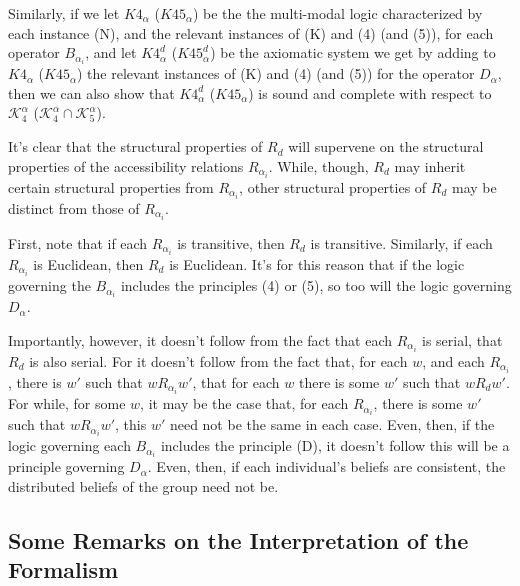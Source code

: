 Similarly, if we let $K4_\alpha$ ($K45_\alpha$) be the the multi-modal logic characterized by each instance (N), and the relevant instances of (K) and (4) (and (5)), for each operator $B_{\alpha_i}$, and let $K4_\alpha^d$ ($K45_\alpha^d$)  be the axiomatic system we get by adding to $K4_\alpha$ ($K45_\alpha$) the relevant instances of (K) and (4) (and (5)) for the operator $D_{\alpha}$, then we can also show that $K4_\alpha^d$ ($K45_\alpha$) is sound and complete with respect to $\mathcal{K}^\alpha_4$ ($\mathcal{K}^\alpha_4 \cap \mathcal{K}^\alpha_5$).

It's clear that the structural properties of $R_d$ will supervene on the structural properties of the accessibility relations $R_{\alpha_i}$.
While, though, $R_d$ may inherit certain structural properties from $R_{\alpha_i}$, other structural properties of $R_d$  may be distinct from those of $R_{\alpha_i}$.

First, note that if each $R_{\alpha_i}$ is transitive, then $R_d$ is transitive.
Similarly, if each $R_{\alpha_i}$ is Euclidean, then $R_d$ is Euclidean.
It's for this reason that if the logic governing the $B_{\alpha_i}$ includes the principles (4) or (5), so too will the logic governing $D_\alpha$.

Importantly, however, it doesn't follow from the fact that each $R_{\alpha_i}$ is serial, that $R_d$ is also serial. 
For it doesn't follow from the fact that, for each $w$, and each $R_{\alpha_i}$, there is $w'$ such that $w R_{\alpha_i} w'$, that for each $w$ there is some $w'$ such that $w R_d w'$.
For while, for some $w$, it may be the case that, for each $R_{\alpha_i}$, there is some $w'$ such that $w R_{\alpha_i} w'$, this $w'$ need not be the same in each case. 
Even, then, if the logic governing each $B_{\alpha_i}$ includes the principle (D), it doesn't follow this will be a principle governing $D_\alpha$.
Even, then, if each individual's beliefs are consistent, the distributed beliefs of the group need not be.



\subsection{Some Remarks on the Interpretation of the Formalism}\label{caie-section1-5}

